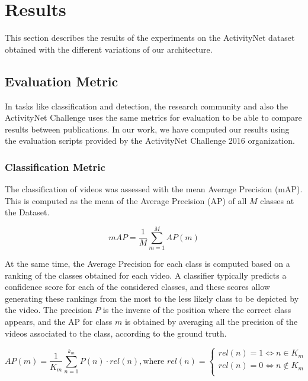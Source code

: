 \chapter{Results}
\label{section:results}

This section describes the results of the experiments on the ActivityNet dataset obtained with the different variations of our architecture.

\section{Evaluation Metric}

In tasks like classification and detection, the research community and also the ActivityNet Challenge uses the same metrics for evaluation to be able to compare results between publications. In our work, we have computed our results using the evaluation scripts provided by the ActivityNet Challenge 2016 organization.

\subsection{Classification Metric}

The classification of videos was assessed with the mean Average Precision (mAP). This is computed as the mean of the Average Precision (AP) of all $M$ classes at the Dataset.

\begin{equation}
	mAP = \frac{1}{M} \sum_{m=1}^{M} AP(m)
\end{equation}

At the same time, the Average Precision for each class is computed based on a ranking of the classes obtained for each video. A classifier typically predicts a confidence score for each of the considered classes, and these scores allow generating these rankings from the most to the less likely class to be depicted by the video. The precision $P$ is the inverse of the position where the correct class appears, and the AP for class $m$ is obtained by averaging all the precision of the videos associated to the class, according to the ground truth. %

\begin{equation}
	AP(m) = \frac{1}{K_m} \sum_{n=1}^{k_m} P(n) \cdot rel(n), \text{where } rel(n) = \begin{cases}
        rel(n) = 1 \Leftrightarrow n \in K_m \\
        rel(n) = 0 \Leftrightarrow n \notin K_m \\
\end{cases}
\end{equation}

